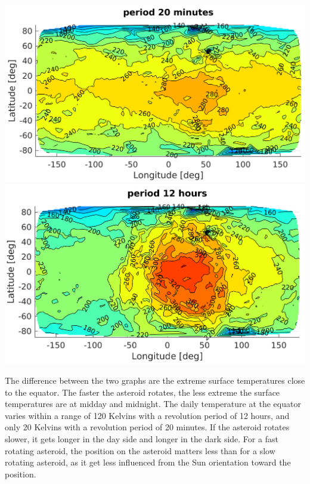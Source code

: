 \begin{center}
    \includegraphics[width=\linewidth]{rsc/theo20mn.png}
    \includegraphics[width=\linewidth]{rsc/theo12h.png}
    \label{fig:7.2}
\end{center}

The difference between the two graphs are the extreme surface temperatures close to the equator. The faster the asteroid rotates, the less extreme the surface temperatures are at midday and midnight. The daily temperature at the equator varies within a range of 120 Kelvins with a revolution period of 12 hours, and only 20 Kelvins with a revolution period of 20 minutes. If the asteroid rotates slower, it gets longer in the day side and longer in the dark side. For a fast rotating asteroid, the position on the asteroid matters less than for a slow rotating asteroid, as it get less influenced from the Sun orientation toward the position.

